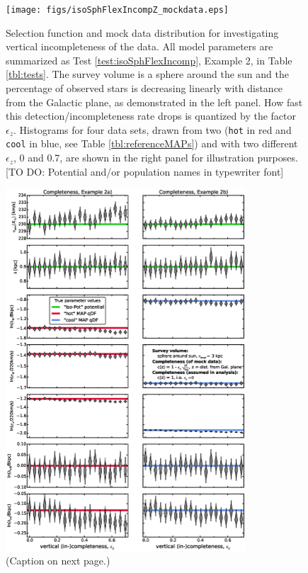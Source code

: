 \begin{figure}
\centering
\texttt{[image: figs/isoSphFlexIncompZ\_mockdata.eps]}
\caption{Selection function and mock data distribution for investigating vertical incompleteness of the data. All model parameters are summarized as Test \ref{test:isoSphFlexIncomp}, Example 2, in Table \ref{tbl:tests}. The survey volume is a sphere around the sun and the percentage of observed stars is decreasing linearly with distance from the Galactic plane, as demonstrated in the left panel. How fast this detection/incompleteness rate drops is quantized by the factor $\epsilon_z$. Histograms for four data sets, drawn from two \MAPs{} (\texttt{hot} in red and \texttt{cool} in blue, see Table \ref{tbl:referenceMAPs}) and with two different $\epsilon_z$, 0 and 0.7, are shown in the right panel for illustration purposes. [TO DO: Potential and/or population names in typewriter font]} 
\label{fig:isoSphFlexIncompZ_mockdata}
\end{figure}


\begin{figure}
\includegraphics[width=0.8\textwidth]{figs/isoSphFlexIncompZ_violins.eps}
\caption{(Caption on next page.)}
\end{figure}


